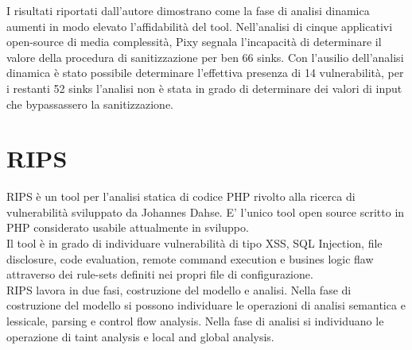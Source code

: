 I risultati riportati dall'autore dimostrano come la fase di analisi dinamica aumenti in modo elevato l'affidabilità del tool. Nell'analisi di cinque applicativi open-source di media complessità, Pixy segnala l'incapacità di determinare il valore della procedura di sanitizzazione per ben 66 sinks. Con l'ausilio dell'analisi dinamica è stato possibile determinare l'effettiva presenza di 14 vulnerabilità, per i restanti 52 sinks l'analisi non è stata in grado di determinare dei valori di input che bypassassero la sanitizzazione.

\section{RIPS}
RIPS è un tool per l'analisi statica di codice PHP rivolto alla ricerca di vulnerabilità sviluppato da Johannes Dahse.
E' l'unico tool open source scritto in PHP considerato usabile attualmente in sviluppo.\\
Il tool è in grado di individuare vulnerabilità di tipo XSS, SQL Injection, file disclosure, code evaluation, remote command execution e busines logic flaw attraverso dei rule-sets definiti nei propri file di configurazione.\\
RIPS lavora in due fasi, costruzione del modello e analisi. Nella fase di costruzione del modello si possono individuare le operazioni di analisi semantica e lessicale, parsing e control flow analysis. Nella fase di analisi si individuano le operazione di taint analysis e local and global analysis.

